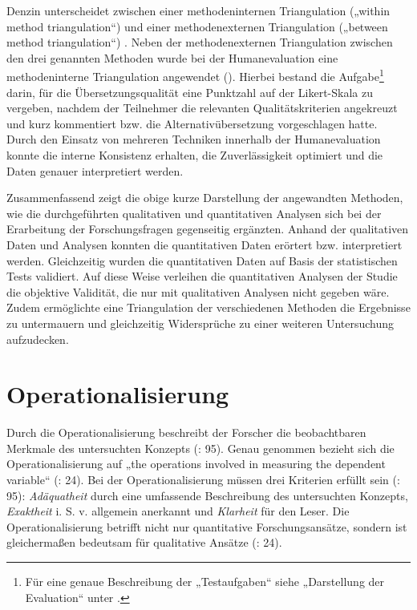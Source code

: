 Denzin unterscheidet zwischen einer methodeninternen Triangulation („within method triangulation“) und einer methodenexternen Triangulation („between method triangulation“) \citep[47]{Kuckartz2014}. Neben der methodenexternen Triangulation zwischen den drei genannten Methoden wurde bei der Humanevaluation eine methodeninterne Triangulation angewendet (). Hierbei bestand die Aufgabe\footnote{{{{Für eine genaue Beschreibung der „Testaufgaben“ siehe „Darstellung der Evaluation“ unter .}}}} darin, für die Übersetzungsqualität eine Punktzahl auf der Likert-Skala zu vergeben, nachdem der Teilnehmer die relevanten Qualitätskriterien angekreuzt und kurz kommentiert bzw. die Alternativübersetzung vorgeschlagen hatte. Durch den Einsatz von mehreren Techniken innerhalb der Humanevaluation konnte die interne Konsistenz erhalten, die Zuverlässigkeit optimiert und die Daten genauer interpretiert werden.

Zusammenfassend zeigt die obige kurze Darstellung der angewandten Methoden, wie die durchgeführten qualitativen und quantitativen Analysen sich bei der Erarbeitung der Forschungsfragen gegenseitig ergänzten. Anhand der qualitativen Daten und Analysen konnten die quantitativen Daten erörtert bzw. interpretiert werden. Gleichzeitig wurden die quantitativen Daten auf Basis der statistischen Tests validiert. Auf diese Weise verleihen die quantitativen Analysen der Studie die objektive Validität, die nur mit qualitativen Analysen nicht gegeben wäre. Zudem ermöglichte eine Triangulation der verschiedenen Methoden die Ergebnisse zu untermauern und gleichzeitig Widersprüche zu einer weiteren Untersuchung aufzudecken.

\section{\label{sec:4.2}Operationalisierung}

Durch die Operationalisierung beschreibt der Forscher die beobachtbaren Merkmale des untersuchten Konzepts (\citealt{FreyEtAl1991}: 95). Genau genommen bezieht sich die Operationalisierung auf „the operations involved in measuring the dependent variable“ (\citealt{SaldanhaOBrien2014}: 24). Bei der Operationalisierung müssen drei Kriterien erfüllt sein (\citealt{FreyEtAl1991}: 95): \textit{Adäquatheit} durch eine umfassende Beschreibung des untersuchten Konzepts, \textit{Exaktheit} i. S. v. allgemein anerkannt und \textit{Klarheit} für den Leser. Die Operationalisierung betrifft nicht nur quantitative Forschungsansätze, sondern ist gleichermaßen bedeutsam für qualitative Ansätze (\citealt{SaldanhaOBrien2014}: 24).

